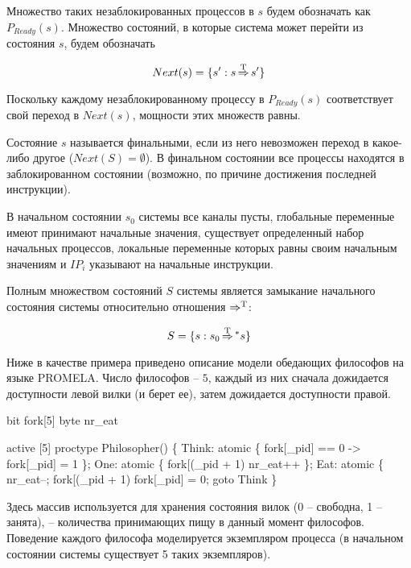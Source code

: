 Множество таких незаблокированных процессов в $s$ будем обозначать как $P_{Ready}(s)$.
Множество состояний, в которые система может перейти из состояния $s$, будем обозначать

\begin{equation}
  \label{eq:next-def}
  Next(s) = \{ s': s \operatorname{\operatorname*{\Rightarrow}^T} s' \}
\end{equation}

Поскольку каждому незаблокированному процессу в $P_{Ready}(s)$ соответствует свой переход
в $Next(s)$, мощности этих множеств равны.

Состояние $s$ называется финальными, если из него невозможен переход в какое-либо другое
($Next(S) = \emptyset$). В финальном состоянии все процессы находятся в заблокированном
состоянии (возможно, по причине достижения последней инструкции).

В начальном состоянии $s_0$ системы все каналы пусты, глобальные переменные имеют
принимают начальные значения, существует определенный набор начальных процессов, локальные
переменные которых равны своим начальным значениям и $IP_i$ указывают на начальные
инструкции.

Полным множеством состояний $S$ системы является замыкание начального
состояния системы относительно отношения $\operatorname{\operatorname*{\Rightarrow}^T}$:

\begin{equation}
  \label{eq:statespace-def}
  S = \{s: s_0 \operatorname{\operatorname*{\Rightarrow}^T} \mbox{}^* s\}
\end{equation}

Ниже в качестве примера приведено описание модели обедающих философов на языке
PROMELA. Число философов -- $5$, каждый из них сначала дожидается доступности левой вилки
(и берет ее), затем дожидается доступности правой.

\label{code:philo}

\begin{CodeBlock}
bit  fork[5]
byte nr_eat

active [5] proctype Philosopher() \{
Think:
  atomic \{ fork[_pid] == 0 -> fork[_pid] = 1 \};
One:
  atomic \{ fork[(_pid + 1)%
           nr_eat++ \};
Eat:
  atomic \{ nr_eat--; fork[(_pid + 1)%
  fork[_pid] = 0;
  goto Think
\}  
\end{CodeBlock}

Здесь массив  используется для хранения состояния вилок (0 -- свободна, 1 --
занята),  -- количества принимающих пищу в данный момент философов. Поведение
каждого философа моделируется экземпляром процесса  (в начальном
состоянии системы существует 5 таких экземпляров).

